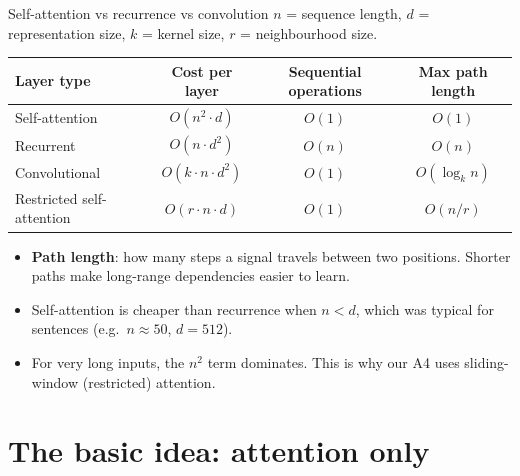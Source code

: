 \documentclass[aspectratio=169,11pt]{beamer}
\begin{document}
\begin{frame}{Self-attention vs recurrence vs convolution}
  \small
  $n$ = sequence length, $d$ = representation size, $k$ = kernel size, $r$ = neighbourhood size.
  \vspace{2mm}

  \begin{tabular}{@{}lccc@{}}
    \toprule
    Layer type & Cost per layer & Sequential operations & Max path length\\
    \midrule
    Self-attention & $O(n^2\cdot d)$ & $O(1)$ & $O(1)$\\
    Recurrent & $O(n\cdot d^2)$ & $O(n)$ & $O(n)$\\
    Convolutional & $O(k\cdot n\cdot d^2)$ & $O(1)$ & $O(\log_k n)$\\
    Restricted self-attention & $O(r\cdot n\cdot d)$ & $O(1)$ & $O(n/r)$\\
    \bottomrule
  \end{tabular}
  \vspace{3mm}

  \begin{itemize}
    \item \textbf{Path length}: how many steps a signal travels between two positions. Shorter paths make long-range dependencies easier to learn.
    \item Self-attention is cheaper than recurrence when $n<d$, which was typical for sentences (e.g.\ $n\approx50$, $d=512$).
    \item For very long inputs, the $n^2$ term dominates. This is why our A4 uses sliding-window (restricted) attention.
  \end{itemize}
\end{frame}

\section{The basic idea: attention only}
\end{document}

